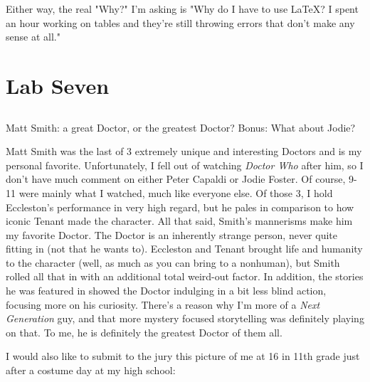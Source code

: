 \documentclass[letterpaper, 10pt,DIV=13]{scrartcl}
\numberwithin{equation}{section} %
\numberwithin{figure}{section} %
\numberwithin{table}{section} %
\begin{document}
Either way, the real "Why?" I'm asking is "Why do I have to use LaTeX? I spent an hour working on tables and they're still throwing errors that don't make any sense at all."

\pagebreak

\section{Lab Seven}

\subsection{}
Matt Smith: a great Doctor, or the greatest Doctor? Bonus: What about Jodie?

Matt Smith was the last of 3 extremely unique and interesting Doctors and is my personal favorite. Unfortunately, I fell out of watching \textit{Doctor Who} after him, so I don't have much comment on either Peter Capaldi or Jodie Foster. Of course, 9-11 were mainly what I watched, much like everyone else. Of those 3, I hold Eccleston's performance in very high regard, but he pales in comparison to how iconic Tenant made the character. All that said, Smith's mannerisms make him my favorite Doctor. The Doctor is an inherently strange person, never quite fitting in (not that he wants to). Eccleston and Tenant brought life and humanity to the character (well, as much as you can bring to a nonhuman), but Smith rolled all that in with an additional total weird-out factor. In addition, the stories he was featured in showed the Doctor indulging in a bit less blind action, focusing more on his curiosity. There's a reason why I'm more of a \textit{Next Generation} guy, and that more mystery focused storytelling was definitely playing on that. To me, he is definitely the greatest Doctor of them all.

I would also like to submit to the jury this picture of me at 16 in 11th grade just after a costume day at my high school:
\end{document}
